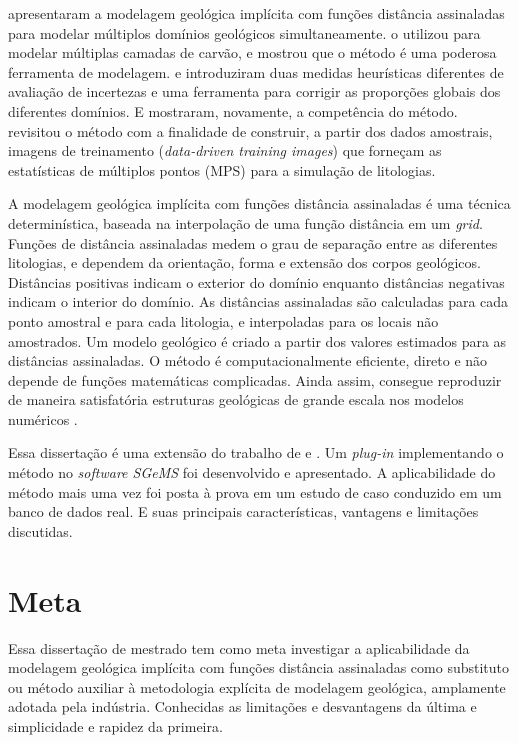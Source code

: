  apresentaram a modelagem geológica implícita com funções distância assinaladas para modelar múltiplos domínios geológicos simultaneamente.  o utilizou para modelar múltiplas camadas de carvão, e mostrou que o método é uma poderosa ferramenta de modelagem.  e  introduziram duas medidas heurísticas diferentes de avaliação de incertezas e  uma ferramenta para corrigir as proporções globais dos diferentes domínios. E mostraram, novamente, a competência do método.  revisitou o método com a finalidade de construir, a partir dos dados amostrais, imagens de treinamento (\textit{data-driven training images}) que forneçam as estatísticas de múltiplos pontos (MPS) para a simulação de litologias. 

A modelagem geológica implícita com funções distância assinaladas é uma técnica determinística, baseada na interpolação de uma função distância em um \textit{grid}. Funções de distância assinaladas medem o grau de separação entre as diferentes litologias, e dependem da orientação, forma e extensão dos corpos geológicos. Distâncias positivas indicam o exterior do domínio enquanto distâncias negativas indicam o interior do domínio. As distâncias assinaladas são calculadas para cada ponto amostral e para cada litologia, e interpoladas para os locais não amostrados. Um modelo geológico é criado a partir dos valores estimados para as distâncias assinaladas. O método é computacionalmente eficiente, direto e não depende de funções matemáticas complicadas. Ainda assim, consegue reproduzir de maneira satisfatória estruturas geológicas de grande escala nos modelos numéricos \cite{maureira}.

Essa dissertação é uma extensão do trabalho de  e . Um \textit{plug-in} implementando o método no \textit{software SGeMS} foi desenvolvido e apresentado. A aplicabilidade do método mais uma vez foi posta à prova em um estudo de caso conduzido em um banco de dados real. E suas principais características, vantagens e limitações discutidas.

\section{Meta}

Essa dissertação de mestrado tem como meta investigar a aplicabilidade da modelagem geológica implícita com funções distância assinaladas como substituto ou método auxiliar à metodologia explícita de modelagem geológica, amplamente adotada pela indústria. Conhecidas as limitações e desvantagens da última e simplicidade e rapidez da primeira.

